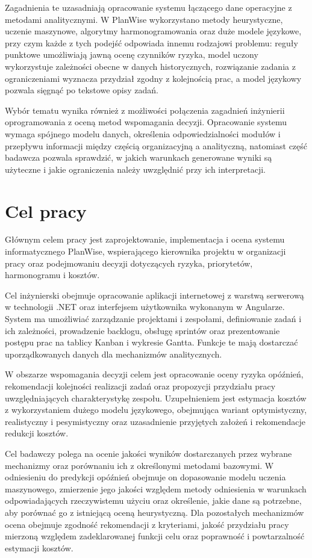 Zagadnienia te uzasadniają opracowanie systemu łączącego dane operacyjne z metodami analitycznymi. W PlanWise wykorzystano metody heurystyczne, uczenie maszynowe, algorytmy harmonogramowania oraz duże modele językowe, przy czym każde z tych podejść odpowiada innemu rodzajowi problemu: reguły punktowe umożliwiają jawną ocenę czynników ryzyka, model uczony wykorzystuje zależności obecne w danych historycznych, rozwiązanie zadania z ograniczeniami wyznacza przydział zgodny z kolejnością prac, a model językowy pozwala sięgnąć po tekstowe opisy zadań.

Wybór tematu wynika również z możliwości połączenia zagadnień inżynierii oprogramowania z oceną metod wspomagania decyzji. Opracowanie systemu wymaga spójnego modelu danych, określenia odpowiedzialności modułów i przepływu informacji między częścią organizacyjną a analityczną, natomiast część badawcza pozwala sprawdzić, w jakich warunkach generowane wyniki są użyteczne i jakie ograniczenia należy uwzględnić przy ich interpretacji.

\section{Cel pracy}

Głównym celem pracy jest zaprojektowanie, implementacja i ocena systemu informatycznego PlanWise, wspierającego kierownika projektu w organizacji pracy oraz podejmowaniu decyzji dotyczących ryzyka, priorytetów, harmonogramu i kosztów.

Cel inżynierski obejmuje opracowanie aplikacji internetowej z warstwą serwerową w technologii .NET oraz interfejsem użytkownika wykonanym w Angularze. System ma umożliwiać zarządzanie projektami i zespołami, definiowanie zadań i ich zależności, prowadzenie backlogu, obsługę sprintów oraz prezentowanie postępu prac na tablicy Kanban i wykresie Gantta. Funkcje te mają dostarczać uporządkowanych danych dla mechanizmów analitycznych.

W obszarze wspomagania decyzji celem jest opracowanie oceny ryzyka opóźnień, rekomendacji kolejności realizacji zadań oraz propozycji przydziału pracy uwzględniających charakterystykę zespołu. Uzupełnieniem jest estymacja kosztów z wykorzystaniem dużego modelu językowego, obejmująca wariant optymistyczny, realistyczny i pesymistyczny oraz uzasadnienie przyjętych założeń i rekomendacje redukcji kosztów.

Cel badawczy polega na ocenie jakości wyników dostarczanych przez wybrane mechanizmy oraz porównaniu ich z określonymi metodami bazowymi. W odniesieniu do predykcji opóźnień obejmuje on dopasowanie modelu uczenia maszynowego, zmierzenie jego jakości względem metody odniesienia w warunkach odpowiadających rzeczywistemu użyciu oraz określenie, jakie dane są potrzebne, aby porównać go z istniejącą oceną heurystyczną. Dla pozostałych mechanizmów ocena obejmuje zgodność rekomendacji z kryteriami, jakość przydziału pracy mierzoną względem zadeklarowanej funkcji celu oraz poprawność i powtarzalność estymacji kosztów.


